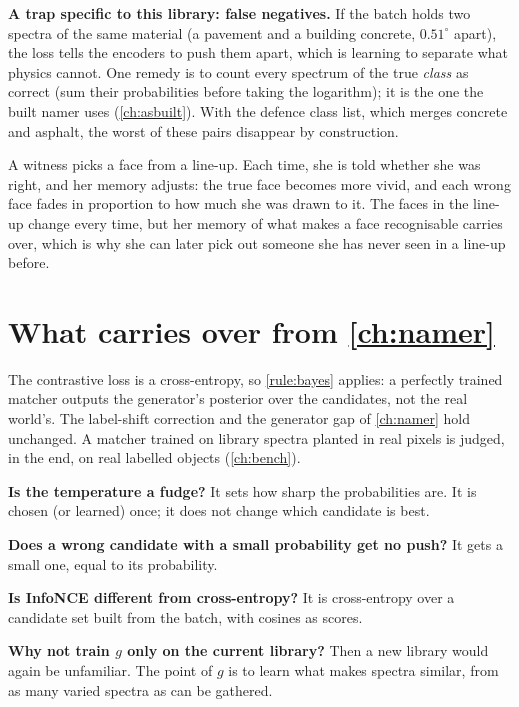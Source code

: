 \documentclass[11pt,a4paper,oneside,openany]{book}
\begin{document}
\textbf{A trap specific to this library: false negatives.} If the batch holds two spectra of the same material (a pavement and a building concrete,
$0.51^\circ$ apart), the loss tells the encoders to push them apart, which is learning to separate what physics cannot. One remedy is to count every spectrum
of the true \emph{class} as correct (sum their probabilities before taking the logarithm); it is the one the built namer uses (\cref{ch:asbuilt}). With the defence class list, which merges concrete and asphalt, the
worst of these pairs disappear by construction.

\begin{analogy}
A witness picks a face from a line-up. Each time, she is told whether she was right, and her memory adjusts: the true face becomes more vivid, and each wrong face
fades in proportion to how much she was drawn to it. The faces in the line-up change every time, but her memory of what makes a face recognisable carries over,
which is why she can later pick out someone she has never seen in a line-up before.
\end{analogy}

\section{What carries over from \cref{ch:namer}}

The contrastive loss is a cross-entropy, so \cref{rule:bayes} applies: a perfectly trained matcher outputs the generator's posterior over the candidates, not the real
world's. The label-shift correction and the generator gap of \cref{ch:namer} hold unchanged. A matcher trained on library spectra planted in real pixels is judged, in
the end, on real labelled objects (\cref{ch:bench}).

\begin{confusions}
\textbf{Is the temperature a fudge?} It sets how sharp the probabilities are. It is chosen (or learned) once; it does not change which candidate is best.

\textbf{Does a wrong candidate with a small probability get no push?} It gets a small one, equal to its probability.

\textbf{Is InfoNCE different from cross-entropy?} It is cross-entropy over a candidate set built from the batch, with cosines as scores.

\textbf{Why not train $g$ only on the current library?} Then a new library would again be unfamiliar. The point of $g$ is to learn what makes spectra similar, from as
many varied spectra as can be gathered.
\end{confusions}
\end{document}
